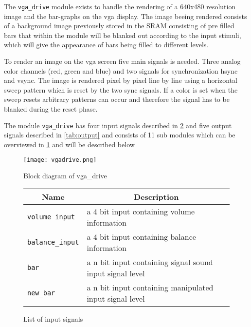 The \verb+vga_drive+ module exists to handle the rendering of a 640x480 resolution image and the bar-graphs on
the vga display. The image beeing rendered consists of a background image previously 
stored in the SRAM consisting of pre filled bars that within the module will be blanked
out according to the input stimuli, which will give the appearance of bars being filled 
to different levels.   

To render an image on the vga screen five main signals is needed. Three analog color channels (red, green and blue)
and two signals for synchronization hsync and vsync. The image is rendered pixel by pixel line by line using
a horizontal sweep pattern which is reset by the two sync signals. If a color is set when the sweep resets
arbitrary patterns can occur and therefore the signal has to be blanked during the reset phase.

The module \verb+vga_drive+ has four input signals described in \ref{tab:input} and five output signals described
in \ref{tab:output} and consists of 11 sub modules which can be overviewed in \ref{fig:vgadrive} and will be described below


\begin{figure}[H]
        \centering
        \texttt{[image: vgadrive.png]}
        \caption{Block diagram of vga\_drive}
        \label{fig:vgadrive}
\end{figure}


\begin{figure}[H]
        \centering
        \caption{List of input signals}
        \label{tab:input}
\begin{tabular}{|l|l|}
        \hline
        \multicolumn{1}{|c|}{Name} & \multicolumn{1}{|c|}{Description} \\
        
        \hline
        \verb+volume_input+ & a 4 bit input containing volume information\\
        \cline{1-2}
        \hline
        \verb+balance_input+ & a 4 bit input containing balance information\\
        \cline{1-2}    
        \hline
        \verb+bar+ & a n bit input containing signal sound input signal level\\
        \cline{1-2}    
        \hline
        \verb+new_bar+ & a n bit input containing manipulated input signal level\\
        \cline{1-2}    
        \hline
\end{tabular}
\end{figure}

